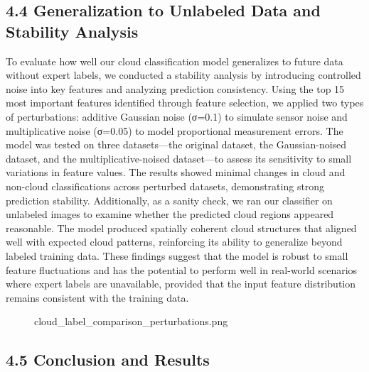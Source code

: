 \documentclass[11pt]{article}
\begin{document}
    \subsection*{4.4 Generalization to Unlabeled Data and Stability
Analysis}\label{generalization-to-unlabeled-data-and-stability-analysis}

To evaluate how well our cloud classification model generalizes to
future data without expert labels, we conducted a stability analysis by
introducing controlled noise into key features and analyzing prediction
consistency. Using the top 15 most important features identified through
feature selection, we applied two types of perturbations: additive
Gaussian noise (σ=0.1) to simulate sensor noise and multiplicative noise
(σ=0.05) to model proportional measurement errors. The model was tested
on three datasets---the original dataset, the Gaussian-noised dataset,
and the multiplicative-noised dataset---to assess its sensitivity to
small variations in feature values. The results showed minimal changes
in cloud and non-cloud classifications across perturbed datasets,
demonstrating strong prediction stability. Additionally, as a sanity
check, we ran our classifier on unlabeled images to examine whether the
predicted cloud regions appeared reasonable. The model produced
spatially coherent cloud structures that aligned well with expected
cloud patterns, reinforcing its ability to generalize beyond labeled
training data. These findings suggest that the model is robust to small
feature fluctuations and has the potential to perform well in real-world
scenarios where expert labels are unavailable, provided that the input
feature distribution remains consistent with the training data.

\begin{figure}
\centering
{}
\caption{cloud\_label\_comparison\_perturbations.png}
\end{figure}

    \subsection*{4.5 Conclusion and Results}
\end{document}
